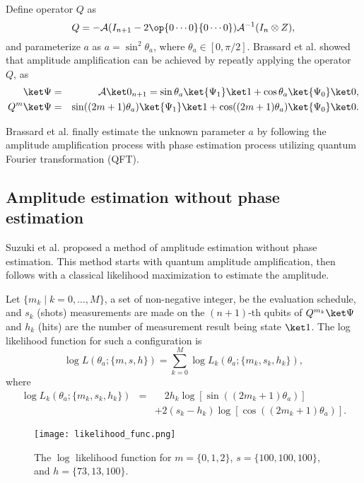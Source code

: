 \documentclass{article}
\begin{document}
Define operator $Q$ as
\begin{equation}
Q = -\mathcal A(I_{n+1}-2\op{0\cdots0}{0\cdots0})\mathcal A^{-1}(I_n\otimes Z),
\end{equation}
and parameterize $a$ as $a = \sin^2\theta_a$, where $\theta_a\in[0,\pi/2]$.
Brassard et al.\cite{brassard_2002} showed that amplitude amplification
can be achieved by repeatly applying the operator $Q$, as
\begin{eqnarray}
  \ket\Psi & = & \mathcal A\ket0_{n+1}  =  \sin\theta_a\ket{\Psi_1}\ket1
  + \cos\theta_a\ket{\Psi_0}\ket0, \\
  Q^m\ket\Psi & = & \sin((2m+1)\theta_a)\ket{\Psi_1}\ket1 
  + \cos((2m+1)\theta_a)\ket{\Psi_0}\ket0.
\end{eqnarray}

Brassard et al.\cite{brassard_2002} finally estimate the unknown
parameter $a$ by following the amplitude amplification process with
phase estimation process utilizing quantum Fourier transformation (QFT).


\subsection{Amplitude estimation without phase estimation}
Suzuki et al.\cite{suzuki_2020} proposed a method of amplitude
estimation without phase estimation.  This method starts with quantum
amplitude amplification, then follows with a classical likelihood
maximization to estimate the amplitude.

Let $\{m_k\mid k = 0, \ldots, M\}$, a set of non-negative integer, be the
evaluation schedule, and
$s_k$ (shots) measurements are made on the $(n+1)$-th qubits of
$Q^{m_k}\ket\Psi$ and $h_k$ (hits) are the number of measurement result
being state $\ket1$.  The log likelihood function for such a
configuration is
\begin{equation}
  \log L(\theta_a; \{m, s, h\}) = \sum_{k=0}^M\log L_k(\theta_a; \{m_k, s_k, h_k\}),
\end{equation}
where
\begin{eqnarray}
  \log L_k(\theta_a; \{m_k, s_k, h_k\}) & = & 
  \quad 2h_k\log\left[\sin((2m_k+1)\theta_a)\right] \nonumber \\
  & & + 2(s_k-h_k)\log\left[\cos((2m_k+1)\theta_a)\right].
  \label{eq:logLk}
\end{eqnarray}

\begin{figure}
  \begin{center}
    \texttt{[image: likelihood\_func.png]}
  \end{center}
  \caption{The $\log$ likelihood function for $m = \{0, 1, 2\}$,
    $s = \{100, 100, 100\}$, and $h = \{73, 13, 100\}$.}
  \label{fig:log_likelihood_func}
\end{figure}
\end{document}
